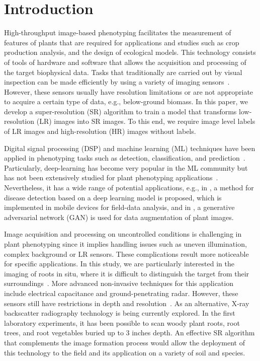 \documentclass[10pt,twocolumn,letterpaper]{article}
\begin{document}
\section{Introduction}
High-throughput image-based phenotyping facilitates the measurement of features of plants that are required for applications and studies such as crop production analysis, and the design of ecological models. This technology consists of tools of hardware and software that allows the acquisition and processing of the target biophysical data. Tasks that traditionally are carried out by visual inspection can be made efficiently by using a variety of imaging sensors~\cite{Fahlgren2015}. However, these sensors usually have resolution limitations or are not appropriate to acquire a certain type of data, e.g., below-ground biomass. In this paper, we develop a super-resolution (SR) algorithm to train a model that transforms low-resolution (LR) images into SR images. To this end, we require image level labels of LR images and high-resolution (HR) images without labels.

Digital signal processing (DSP) and machine learning (ML) techniques have been applied in phenotyping tasks such as detection, classification, and prediction~\cite{Singh2018}. Particularly, deep-learning has become very popular in the ML community but has not been extensively studied for plant phenotyping applications~\cite{Ubbens2017}. Nevertheless, it has a wide range of potential applications, e.g., in \cite{Ramcharan2017}, a method for disease detection based on a deep learning model is proposed, which is implemented in mobile devices for field-data analysis, and in \cite{Giuffrida2017}, a generative adversarial network (GAN) is used for data augmentation of plant images.

Image acquisition and processing on uncontrolled conditions is challenging in plant phenotyping since it implies handling issues such as uneven illumination, complex background or LR sensors. These complications result more noticeable for specific applications. In this study, we are particularly interested in the imaging of roots in situ, where it is difficult to distinguish the target from their surroundings~\cite{Tabb2018}. More advanced non-invasive techniques for this application include electrical capacitance and ground-penetrating radar. However, these sensors still have restrictions in depth and resolution~\cite{Araus2014}. As an alternative, X-ray backscatter radiography technology is being currently explored. In the first laboratory experiments, it has been possible to scan woody plant roots, root trees, and root vegetables buried up to 3 inches depth. An effective SR algorithm that complements the image formation process would allow the deployment of this technology to the field and its application on a variety of soil and species.
\end{document}
